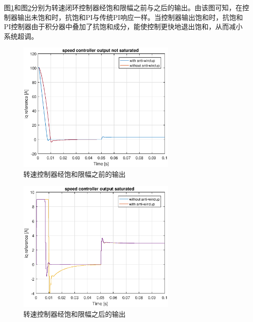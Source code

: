 
图\ref{fig:speed_controller_out_not_saturated}和图\ref{fig:speed_controller_out_saturated}分别为转速闭环控制器经饱和限幅之前与之后的输出。由该图可知，在控制器输出未饱和时，抗饱和PI与传统PI响应一样。当控制器输出饱和时，抗饱和PI控制器由于积分器中叠加了抗饱和成分，能使控制更快地退出饱和，从而减小系统超调。
\begin{figure}[H]
	\centering
	\includegraphics[width=0.7\textwidth]{figs/speed_controller_output_not_saturated.eps}
	\caption{转速控制器经饱和限幅之前的输出}
	\label{fig:speed_controller_out_not_saturated}
\end{figure}
\begin{figure}[H]
	\centering
	\includegraphics[width=0.7\textwidth]{figs/speed_controller_output_saturated.eps}
	\caption{转速控制器经饱和限幅之后的输出}
	\label{fig:speed_controller_out_saturated}
\end{figure}
